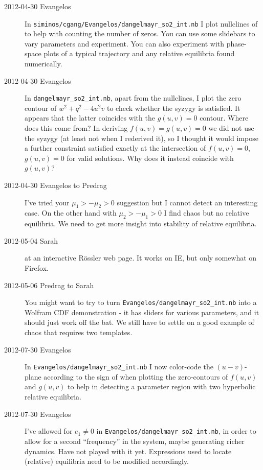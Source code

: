 \begin{description}
\item[2012-04-30 Evangelos] In \texttt{siminos/cgang/Evangelos/dangelmayr\_so2\_int.nb}
I plot nullclines of  to help with counting the number of
zeros. You can use some slidebars to vary parameters and experiment. You can
also experiment with phase-space plots of a typical trajectory and any relative
equilibria found numerically.

\item[2012-04-30 Evangelos] In \texttt{dangelmayr\_so2\_int.nb}, apart from
the nullclines, I plot the zero contour of $w^2+q^2-4u^2v$ to check whether
the syzygy is satisfied. It appears that the latter coincides with the $g(u,v)=0$
contour. Where does this come from? In deriving $f(u,v)=g(u,v)=0$ we did not
use the syzygy (at least not when I rederived it), so I thought it would impose
a further constraint satisfied exactly at the intersection of $f(u,v)=0$,
$g(u,v)=0$ for valid solutions. Why does it instead coincide with $g(u,v)$?

\item[2012-04-30 Evangelos to Predrag] I've tried your $\mu_1>-\mu_2>0$
suggestion but I cannot detect an interesting case. On the other hand with
$\mu_2>-\mu_1>0$ I find chaos but no relative equilibria. We need to get more
insight into stability of relative equilibria.


\item[2012-05-04 Sarah]
 at an interactive R\"ossler web page.  It works on IE, but only
somewhat on Firefox.

\item[2012-05-06  Predrag to Sarah]
You might want to try to turn \texttt{Evangelos/dangelmayr\_so2\_int.nb}
into a {\twoMode} Wolfram CDF demonstration - it has sliders for various
parameters, and it should just work off the bat. We still have to settle
on a good example of chaos that requires two templates.

\item[2012-07-30 Evangelos] In \texttt{Evangelos/dangelmayr\_so2\_int.nb}
I now color-code the $(u-v)$-plane according to the sign of
 when plotting the zero-contours of $f(u,v)$ and
$g(u,v)$ to help in detecting a parameter region with two hyperbolic
relative equilibria.

\item[2012-07-30 Evangelos] I've allowed for $e_1 \neq 0$ in
\texttt{Evangelos/dangelmayr\_so2\_int.nb}, in order to allow for a
second ``frequency'' in the system, maybe generating richer dynamics.
Have not played with it yet. Expressions used to locate (relative)
equilibria need to be modified accordingly.


\end{description}
